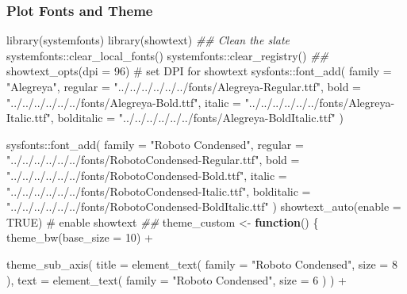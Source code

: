 \documentclass[
  letterpaper,
  DIV=11,
  numbers=noendperiod,
  oneside]{scrartcl}
\newenvironment{Shaded}{\begin{snugshade}}{\end{snugshade}}
\newcommand{\AttributeTok}[1]{\textcolor[rgb]{0.40,0.45,0.13}{#1}}
\newcommand{\CommentTok}[1]{\textcolor[rgb]{0.37,0.37,0.37}{#1}}
\newcommand{\ConstantTok}[1]{\textcolor[rgb]{0.56,0.35,0.01}{#1}}
\newcommand{\ControlFlowTok}[1]{\textcolor[rgb]{0.00,0.23,0.31}{\textbf{#1}}}
\newcommand{\DecValTok}[1]{\textcolor[rgb]{0.68,0.00,0.00}{#1}}
\newcommand{\DocumentationTok}[1]{\textcolor[rgb]{0.37,0.37,0.37}{\textit{#1}}}
\newcommand{\FunctionTok}[1]{\textcolor[rgb]{0.28,0.35,0.67}{#1}}
\newcommand{\NormalTok}[1]{\textcolor[rgb]{0.00,0.23,0.31}{#1}}
\newcommand{\OtherTok}[1]{\textcolor[rgb]{0.00,0.23,0.31}{#1}}
\newcommand{\SpecialCharTok}[1]{\textcolor[rgb]{0.37,0.37,0.37}{#1}}
\newcommand{\StringTok}[1]{\textcolor[rgb]{0.13,0.47,0.30}{#1}}
\begin{document}
\subsubsection{Plot Fonts and Theme}\label{plot-fonts-and-theme}

\begin{Shaded}
\begin{Highlighting}[]
\FunctionTok{library}\NormalTok{(systemfonts)}
\FunctionTok{library}\NormalTok{(showtext)}
\DocumentationTok{\#\# Clean the slate}
\NormalTok{systemfonts}\SpecialCharTok{::}\FunctionTok{clear\_local\_fonts}\NormalTok{()}
\NormalTok{systemfonts}\SpecialCharTok{::}\FunctionTok{clear\_registry}\NormalTok{()}
\DocumentationTok{\#\#}
\FunctionTok{showtext\_opts}\NormalTok{(}\AttributeTok{dpi =} \DecValTok{96}\NormalTok{) }\CommentTok{\# set DPI for showtext}
\NormalTok{sysfonts}\SpecialCharTok{::}\FunctionTok{font\_add}\NormalTok{(}
  \AttributeTok{family =} \StringTok{"Alegreya"}\NormalTok{,}
  \AttributeTok{regular =} \StringTok{"../../../../../../fonts/Alegreya{-}Regular.ttf"}\NormalTok{,}
  \AttributeTok{bold =} \StringTok{"../../../../../../fonts/Alegreya{-}Bold.ttf"}\NormalTok{,}
  \AttributeTok{italic =} \StringTok{"../../../../../../fonts/Alegreya{-}Italic.ttf"}\NormalTok{,}
  \AttributeTok{bolditalic =} \StringTok{"../../../../../../fonts/Alegreya{-}BoldItalic.ttf"}
\NormalTok{)}

\NormalTok{sysfonts}\SpecialCharTok{::}\FunctionTok{font\_add}\NormalTok{(}
  \AttributeTok{family =} \StringTok{"Roboto Condensed"}\NormalTok{,}
  \AttributeTok{regular =} \StringTok{"../../../../../../fonts/RobotoCondensed{-}Regular.ttf"}\NormalTok{,}
  \AttributeTok{bold =} \StringTok{"../../../../../../fonts/RobotoCondensed{-}Bold.ttf"}\NormalTok{,}
  \AttributeTok{italic =} \StringTok{"../../../../../../fonts/RobotoCondensed{-}Italic.ttf"}\NormalTok{,}
  \AttributeTok{bolditalic =} \StringTok{"../../../../../../fonts/RobotoCondensed{-}BoldItalic.ttf"}
\NormalTok{)}
\FunctionTok{showtext\_auto}\NormalTok{(}\AttributeTok{enable =} \ConstantTok{TRUE}\NormalTok{) }\CommentTok{\# enable showtext}
\DocumentationTok{\#\#}
\NormalTok{theme\_custom }\OtherTok{\textless{}{-}} \ControlFlowTok{function}\NormalTok{() \{}
  \FunctionTok{theme\_bw}\NormalTok{(}\AttributeTok{base\_size =} \DecValTok{10}\NormalTok{) }\SpecialCharTok{+}

    \FunctionTok{theme\_sub\_axis}\NormalTok{(}
      \AttributeTok{title =} \FunctionTok{element\_text}\NormalTok{(}
        \AttributeTok{family =} \StringTok{"Roboto Condensed"}\NormalTok{,}
        \AttributeTok{size =} \DecValTok{8}
\NormalTok{      ),}
      \AttributeTok{text =} \FunctionTok{element\_text}\NormalTok{(}
        \AttributeTok{family =} \StringTok{"Roboto Condensed"}\NormalTok{,}
        \AttributeTok{size =} \DecValTok{6}
\NormalTok{      )}
\NormalTok{    ) }\SpecialCharTok{+}


\end{Highlighting}
\end{Shaded}
\end{document}
